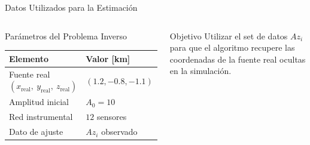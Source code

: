 \begin{frame}{Datos Utilizados para la Estimación}
\begin{columns}[T]
        \begin{block}{Parámetros del Problema Inverso}
            \centering
            \scriptsize
            \begin{tabular}{@{}ll@{}}
                \toprule
                \textbf{Elemento} & \textbf{Valor [km]} \\ \midrule
                Fuente real $(x_{\text{real}},\ y_{\text{real}},\ z_{\text{real}})$ & $(1.2, -0.8, -1.1)$ \\ \vspace{0.1cm}
                Amplitud inicial & $A_0 = 10$ \\ \vspace{0.1cm}
                Red instrumental & $12$ sensores \\ \vspace{0.1cm}
                Dato de ajuste & $Az_i$ observado \\ \bottomrule
            \end{tabular}
        \end{block}

        \vspace{0.5cm}
        
        \begin{block}{Objetivo}
            \scriptsize
            Utilizar el set de datos $Az_i$ para que el algoritmo recupere las coordenadas de la fuente real ocultas en la simulación.
        \end{block}

    \end{columns}

\end{frame}